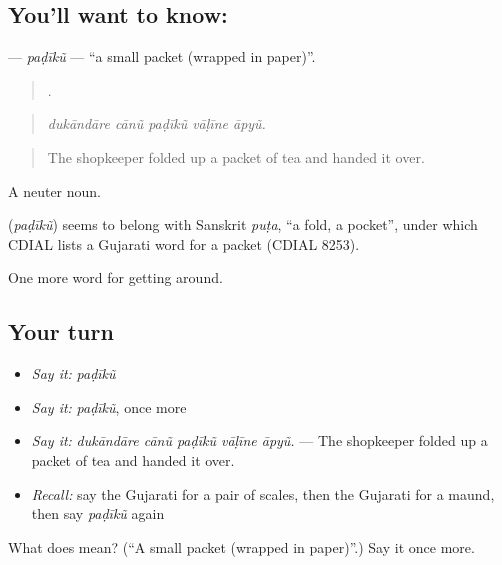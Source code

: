 \subsection*{You'll want to know: }
\textbf{} — \emph{paḍīkũ} — \textquotedblleft{}a small packet (wrapped in paper)\textquotedblright{}.

\begin{quote}
    .
\end{quote}

\begin{quote}
\emph{dukāndāre cānũ paḍīkũ vāḷīne āpyũ.}
\end{quote}

\begin{quote}
The shopkeeper folded up a packet of tea and handed it over.
\end{quote}

A neuter noun.

\begin{cousinweb}
\textbf{} (\emph{paḍīkũ}) seems to belong with Sanskrit \emph{puṭa}, \textquotedblleft{}a fold, a pocket\textquotedblright{}, under which CDIAL lists a Gujarati word for a packet (CDIAL 8253).
\end{cousinweb}

\begin{grammarlens}[title={What you've built}]
One more word for getting around.
\end{grammarlens}

\subsection*{Your turn}
\begin{itemize}
\raggedright
  \item \emph{Say it:} \emph{paḍīkũ}
  \item \emph{Say it:} \emph{paḍīkũ}, once more
  \item \emph{Say it:} \emph{dukāndāre cānũ paḍīkũ vāḷīne āpyũ.} — The shopkeeper folded up a packet of tea and handed it over.
  \item \emph{Recall:} say the Gujarati for a pair of scales, then the Gujarati for a maund, then say \emph{paḍīkũ} again
\end{itemize}

\begin{tcolorbox}[breakable,colback=teal!4,colframe=teal!35!black,title={Before you move on}]
What does  mean? (\textquotedblleft{}A small packet (wrapped in paper)\textquotedblright{}.) Say it once more.
\end{tcolorbox}
